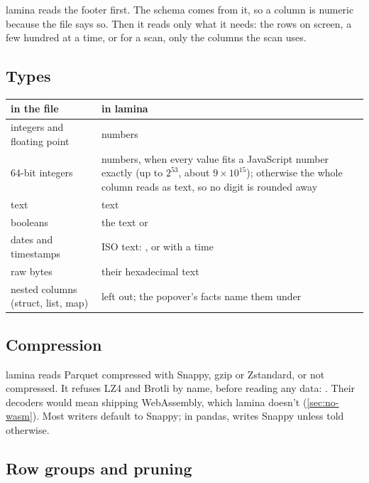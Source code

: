 lamina reads the footer first. The schema comes from it, so a column is numeric because the file says
so. Then it reads only what it needs: the rows on screen, a few hundred at a time, or for a scan, only
the columns the scan uses.

\subsection{Types}

\begin{center}\small
\begin{tabularx}{\linewidth}{@{}lL@{}}
\toprule
\sffamily\bfseries in the file & \sffamily\bfseries in lamina \\
\midrule
integers and floating point & numbers \\
64-bit integers & numbers, when every value fits a JavaScript number exactly (up to $2^{53}$, about
$9\times10^{15}$); otherwise the whole column reads as text, so no digit is rounded away \\
text & text \\
booleans & the text  or  \\
dates and timestamps & ISO text: , or  with a time \\
raw bytes & their hexadecimal text \\
nested columns (struct, list, map) & left out; the popover's facts name them under  \\
\bottomrule
\end{tabularx}
\end{center}

\subsection{Compression}

lamina reads Parquet compressed with Snappy, gzip or Zstandard, or not compressed. It refuses LZ4 and
Brotli by name, before reading any data: . Their decoders would mean shipping WebAssembly, which lamina doesn't
(\cref{sec:no-wasm}). Most writers default to Snappy; in pandas,  writes
Snappy unless told otherwise.

\subsection{Row groups and pruning}\label{sec:pruning}

